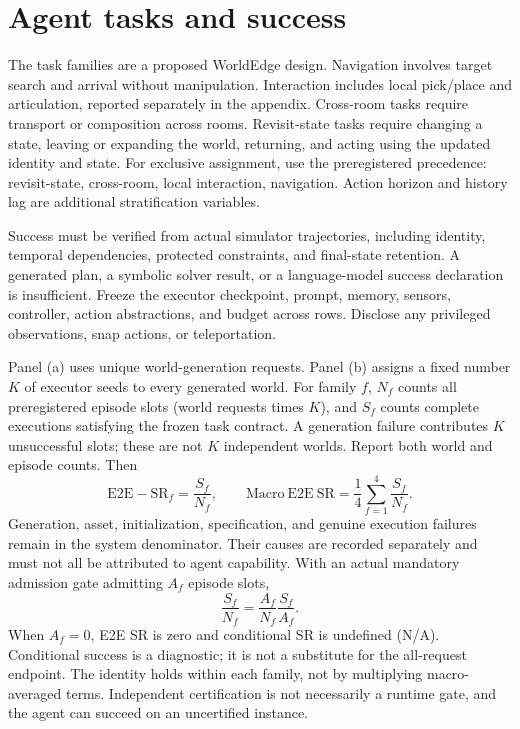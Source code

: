 \documentclass[10pt,a4paper]{article}
\begin{document}
\section{Agent tasks and success}
The task families are a proposed WorldEdge design. Navigation involves target search and arrival without manipulation. Interaction includes local pick/place and articulation, reported separately in the appendix. Cross-room tasks require transport or composition across rooms. Revisit-state tasks require changing a state, leaving or expanding the world, returning, and acting using the updated identity and state. For exclusive assignment, use the preregistered precedence: revisit-state, cross-room, local interaction, navigation. Action horizon and history lag are additional stratification variables.

Success must be verified from actual simulator trajectories, including identity, temporal dependencies, protected constraints, and final-state retention. A generated plan, a symbolic solver result, or a language-model success declaration is insufficient. Freeze the executor checkpoint, prompt, memory, sensors, controller, action abstractions, and budget across rows. Disclose any privileged observations, snap actions, or teleportation.

Panel (a) uses unique world-generation requests. Panel (b) assigns a fixed number $K$ of executor seeds to every generated world. For family $f$, $N_f$ counts all preregistered episode slots (world requests times $K$), and $S_f$ counts complete executions satisfying the frozen task contract. A generation failure contributes $K$ unsuccessful slots; these are not $K$ independent worlds. Report both world and episode counts. Then
\begin{equation}
 \mathrm{E2E\!\!-\!\!SR}_f=\frac{S_f}{N_f},\qquad
 \mathrm{Macro\ E2E\ SR}=\frac14\sum_{f=1}^{4}\frac{S_f}{N_f}.
\end{equation}
Generation, asset, initialization, specification, and genuine execution failures remain in the system denominator. Their causes are recorded separately and must not all be attributed to agent capability. With an actual mandatory admission gate admitting $A_f$ episode slots,
\begin{equation}
 \frac{S_f}{N_f}=\frac{A_f}{N_f}\frac{S_f}{A_f}.
\end{equation}
When $A_f=0$, E2E SR is zero and conditional SR is undefined (N/A). Conditional success is a diagnostic; it is not a substitute for the all-request endpoint. The identity holds within each family, not by multiplying macro-averaged terms. Independent certification is not necessarily a runtime gate, and the agent can succeed on an uncertified instance.
\end{document}
